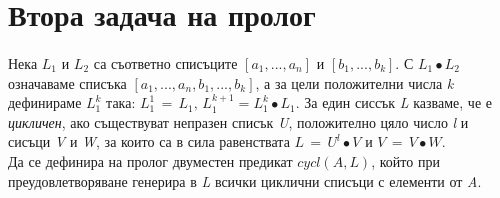 \documentclass[12pt]{article}
\begin{document}
\newpage
\section{Втора задача на пролог}

\paragraph{} 
Нека $L_{1}$ и $L_{2}$ са съответно списъците $[a_1,...,a_n]$ и $[b_1,...,b_k]$. 
С $L_{1} \bullet L_{2}$ означаваме списъка $[a_1,...,a_n,b_1,...,b_k]$, а за цели положителни числа \textit{k} дефинираме $L_1^k$ така: $L_1^1\,=\,L_1,\, L_1^{k+1}=L_1^k\bullet L_1$. 
За един сиссък \textit{L} казваме, че е \textit{цикличен}, ако съществуват непразен списък \textit{U}, положително цяло число \textit{l} и сисъци \textit{V} и \textit{W}, за които са в сила равенствата $L\,=\, U^l\bullet V$ и $V \,=\,V\bullet W$.\\
Да се дефинира на пролог двуместен предикат $cycl(A,L)$, който при преудовлетворяване генерира в \textit{L} всички циклични списъци с елементи от \textit{A}.
\end{document}

